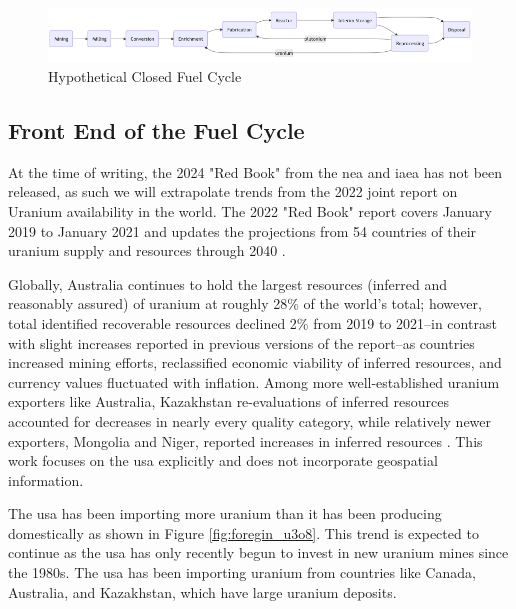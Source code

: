\begin{figure}[H]
      \centering
      \includegraphics[scale=0.55]{images/nfc/closed_fc.png}
      \caption{Hypothetical Closed Fuel Cycle}
      \label{fig:closed_fc}
\end{figure}


\subsection{Front End of the Fuel Cycle}
\label{sec:front_end}
At the time of writing, the 2024 "Red Book" from the \gls{nea} and \gls{iaea}
has not been released, as such we will extrapolate trends from the 2022 joint
report on Uranium availability in the world. The 2022 "Red Book" report covers
January 2019 to January 2021 and updates the projections from 54 countries of
their uranium supply and resources through 2040 \cite{nea_red_book_2022}.

Globally, Australia continues to hold the largest resources (inferred and
reasonably assured) of uranium at roughly 28\% of the world's total; however,
total identified recoverable resources declined 2\% from 2019 to 2021--in
contrast with slight increases reported in previous versions of the report--as
countries increased mining efforts, reclassified economic viability of inferred
resources, and currency values fluctuated with inflation. Among more
well-established uranium exporters like Australia, Kazakhstan re-evaluations of
inferred resources accounted for decreases in nearly every quality category,
while relatively newer exporters, Mongolia and Niger, reported increases in
inferred resources \cite{nea_red_book_2022}. This work focuses on the \gls{usa}
explicitly and does not incorporate geospatial information.

The \gls{usa} has been importing more uranium than it has been producing
domestically as shown in Figure \ref{fig:foregin_u3o8}. This trend is expected
to continue as the \gls{usa} has only recently begun to invest in new uranium
mines since the 1980s. The \gls{usa} has been importing uranium from countries
like Canada, Australia, and Kazakhstan, which have large uranium deposits.

